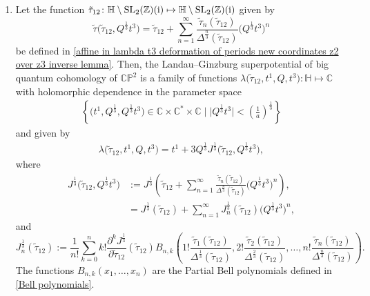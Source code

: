 \begin{Theorem}\quad
\begin{enumerate}\itemsep=0pt
\item[$(1)$]
Let the function
$
\tilde\tau_{12}\colon \mathbb{H}\setminus{ {\rm SL}_2(\mathbb{Z})({\rm i})} \mapsto \mathbb{H}\setminus{ {\rm SL}_2(\mathbb{Z})({\rm i})}
$
given by
\[
\tilde\tau\bigl(\tilde\tau_{12},Q^{\frac{1}{3}}t^3\bigr)=\tilde\tau_{12}+\sum_{n=1}^{\infty}\frac{\tilde\tau_{n}(\tilde\tau_{12})}{\Delta^{\frac{n}{3}}(\tilde\tau_{12})} \bigl( Q^{\frac{1}{3}}t^3\bigr)^n
\]
be defined in \eqref{affine in lambda t3 deformation of periods new coordinates z2 over z3 inverse lemma}.
Then, the Landau--Ginzburg superpotential of big quantum cohomology of $\mathbb{CP}^2$ is a family of functions
$
\lambda\bigl(\tilde\tau_{12}, t^1, Q, t^3\bigr)\colon \mathbb{H} \mapsto \mathbb{C}
$
with holomorphic dependence in the parameter space
\begin{gather*}
\left\{\bigl(t^1,Q^{\frac{1}{3}}, Q^{\frac{1}{3}}t^3\bigr) \in \mathbb{C}\times\mathbb{C}^{*}\times \mathbb{C}\mid \big|Q^{\frac{1}{3}}t^3\big|<\left(\frac{1}{a}\right)^{\frac{1}{3}} \right\}
\end{gather*}
and given by
\begin{gather}\label{lg superpotential of small quantum cohomology j function big quantum cohomology main body}
\lambda\bigl(\tilde\tau_{12}, t^1, Q, t^3\bigr)=t^1+3Q^{\frac{1}{3}}J^{\frac{1}{3}}\bigl(\tilde\tau_{12}, Q^{\frac{1}{3}}t^3\bigr),
\end{gather}
where
\begin{align}
J^{\frac{1}{3}}\bigl(\tilde\tau_{12}, Q^{\frac{1}{3}}t^3\bigr)&:=J^{\frac{1}{3}}\left(\tilde\tau_{12}+\sum_{n=1}^{\infty}\frac{\tilde\tau_{n}(\tilde\tau_{12})}{\Delta^{\frac{n}{3}}(\tilde\tau_{12})} \bigl( Q^{\frac{1}{3}}t^3\bigr)^n\right),\nonumber\\
&=J^{\frac{1}{3}}(\tilde\tau_{12})+\sum_{n=1}^{\infty}J_n^{\frac{1}{3}}(\tilde\tau_{12})\bigl( Q^{\frac{1}{3}}t^3\bigr)^n,\label{definition of t3 deformation of gamma2}
\end{align}
and
\[
J_n^{\frac{1}{3}}(\tilde\tau_{12}):=\frac{1}{n!}\sum_{k=0}^n k!\frac{\partial^kJ^{\frac{1}{3}}}{\partial\tilde\tau_{12}}(\tilde\tau_{12}) B_{n,k}\left( 1!\frac{\tilde\tau_{1}(\tilde\tau_{12})}{\Delta^{\frac{1}{3}}(\tilde\tau_{12})} ,2!\frac{\tilde\tau_{2}(\tilde\tau_{12})}{\Delta^{\frac{2}{3}}(\tilde\tau_{12})},\dots,n!\frac{\tilde\tau_{n}(\tilde\tau_{12})}{\Delta^{\frac{n}{3}}(\tilde\tau_{12})}\right).
\]
The functions $B_{n,k}(x_1,\dots,x_n)$ are the Partial Bell polynomials defined in \eqref{Bell polynomials}.


\end{enumerate}
\end{Theorem}
